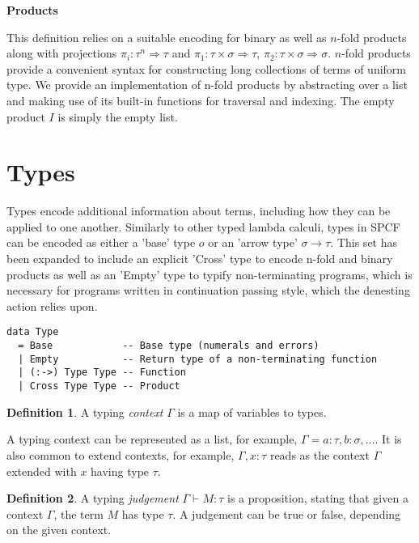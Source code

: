 \documentclass[12pt,a4paper]{report}
\theoremstyle{definition}
\newtheorem{definition}{Definition}[chapter]%
\theoremstyle{remark}
\begin{document}
\textbf{Products}

This definition relies on a suitable encoding for binary as well as $n$-fold products along with projections $\pi_i : \tau^n \Rightarrow \tau$ and $\pi_1 : \tau \times \sigma \Rightarrow \tau$, $\pi_2 : \tau \times \sigma \Rightarrow \sigma$. $n$-fold products provide a convenient syntax for constructing long collections of terms of uniform type. We provide an implementation of n-fold products by abstracting over a list and making use of its built-in functions for traversal and indexing. The empty product $I$ is simply the empty list.

\section{Types}\label{section: typing}
Types encode additional information about terms, including how they can be applied to one another. Similarly to other typed lambda calculi, types in SPCF can be encoded as either a 'base' type $o$ or an 'arrow type' $\sigma \rightarrow \tau$. This set has been expanded to include an explicit 'Cross' type to encode n-fold and binary products as well as an 'Empty' type to typify non-terminating programs, which is necessary for programs written in continuation passing style, which the denesting action relies upon.

\begin{listing}
\caption{SPCF inductive definition for types using an ADT}
\begin{verbatim}
data Type
  = Base            -- Base type (numerals and errors)
  | Empty           -- Return type of a non-terminating function
  | (:->) Type Type -- Function
  | Cross Type Type -- Product
\end{verbatim}
\label{listing:type-adt}
\end{listing}

\begin{definition}
    A typing \emph{context} $\Gamma$ is a map of variables to types.
\end{definition}

A typing context can be represented as a list, for example, $\Gamma = a:\tau, b:\sigma, \ldots$. It is also common to extend contexts, for example, $\Gamma, x:\tau$ reads as the context $\Gamma$ extended with $x$ having type $\tau$. 

\begin{definition}
    A typing \emph{judgement} $\Gamma \vdash M:\tau$ is a proposition, stating that given a context $\Gamma$, the term $M$ has type $\tau$. A judgement can be true or false, depending on the given context.
\end{definition}
\end{document}
